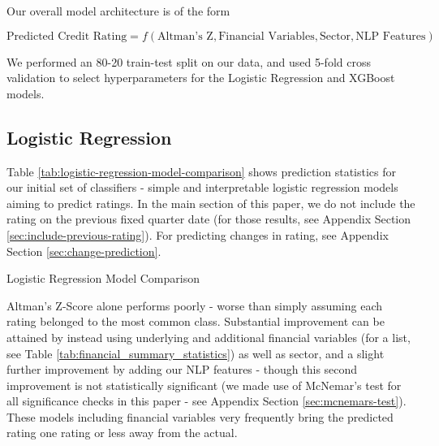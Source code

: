 \documentclass{article}[11pt]
\begin{document}
    Our overall model architecture is of the form

    \begin{equation*}
        \text{Predicted Credit Rating} = f(\text{Altman's Z}, \text{Financial Variables}, \text{Sector}, \text{NLP Features})
    \end{equation*}

    We performed an 80-20 train-test split on our data, and used 5-fold cross validation to select hyperparameters for the Logistic Regression and XGBoost models.

    \subsection*{Logistic Regression}

    Table \ref{tab:logistic-regression-model-comparison} shows prediction statistics for our initial set of classifiers - simple and interpretable logistic regression models aiming to predict ratings. In the main section of this paper, we do not include the rating on the previous fixed quarter date (for those results, see Appendix Section \ref{sec:include-previous-rating}). For predicting changes in rating, see Appendix Section \ref{sec:change-prediction}.
    
    \begin{table}[h!]
        \centering
        \caption{Logistic Regression Model Comparison}
        
        \label{tab:logistic-regression-model-comparison}
    \end{table}

    Altman's Z-Score alone performs poorly - worse than simply assuming each rating belonged to the most common class. Substantial improvement can be attained by instead using underlying and additional financial variables (for a list, see Table \ref{tab:financial_summary_statistics}) as well as sector, and a slight further improvement by adding our NLP features - though this second improvement is not statistically significant (we made use of McNemar's test for all significance checks in this paper - see Appendix Section \ref{sec:mcnemars-test}). These models including financial variables very frequently bring the predicted rating one rating or less away from the actual.
\end{document}
